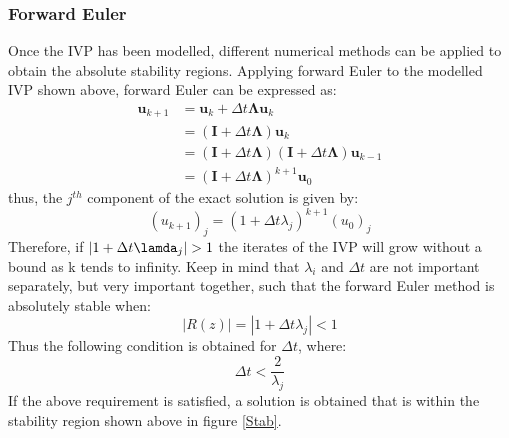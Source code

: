 \documentclass[conf]{new-aiaa}
\begin{document}
        \subsubsection{Forward Euler}
        Once the IVP has been modelled, different numerical methods can be applied to obtain the absolute stability regions. Applying forward Euler to the modelled IVP shown above, forward Euler can be expressed as\cite{LecAS}:
        \begin{equation}
        \begin{aligned}
        \bm{u}_{k+1} &=\bm{u}_{k}+\Delta t \bm{\Lambda} \bm{u}_{k} \\
        &=(\bm{I}+\Delta t \bm{\Lambda}) \bm{u}_{k} \\
        &=(\bm{I}+\Delta t \bm{\Lambda})(\bm{I}+\Delta t \bm{\Lambda}) \bm{u}_{k-1} \\
        &=(\bm{I}+\Delta t \bm{\Lambda})^{k+1} \bm{u}_{0}
        \end{aligned}
        \end{equation}
        thus, the $j^{th}$ component of the exact solution is given by:
        \begin{equation}
            (u_{k+1})_j = (1 + \Delta t \lambda_j)^{k+1}(u_0)_j
        \end{equation}
        Therefore, if $|1 + \Delta t\lamda_j| > 1$ the iterates of the IVP will grow without a bound as k tends to infinity. Keep in mind that $\lambda_{i}$ and $\Delta t$ are not important separately, but very important together, such that the forward Euler method is absolutely stable when: 
        \begin{equation}
            |R(z)| = |1 + \Delta t \lambda_{j}| < 1
        \end{equation}
        Thus the following condition is obtained for $\Delta t$, where:
        \begin{equation}
            \Delta t < \frac{2}{\lambda_j}
        \end{equation}
        If the above requirement is satisfied, a solution is obtained that is within the stability region shown above in figure \ref{Stab}.
        
\end{document}
